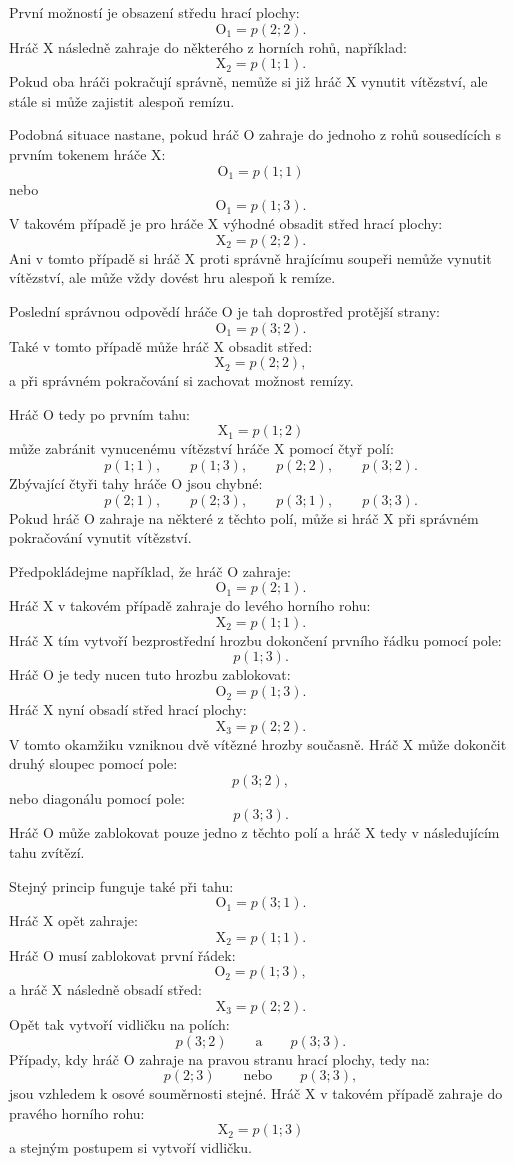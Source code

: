 \documentclass[12pt,a4paper]{article}
\begin{document}
První možností je obsazení středu hrací plochy:
\[
    \mathrm{O}_1=p(2;2).
\]
Hráč $\mathrm{X}$ následně zahraje do některého z horních rohů, například:
\[
    \mathrm{X}_2=p(1;1).
\]
Pokud oba hráči pokračují správně, nemůže si již hráč $\mathrm{X}$ vynutit vítězství, 
ale stále si může zajistit alespoň remízu.

Podobná situace nastane, pokud hráč $\mathrm{O}$ zahraje do 
jednoho z rohů sousedících s prvním tokenem hráče $\mathrm{X}$:
\[
    \mathrm{O}_1=p(1;1)
\]
nebo
\[
    \mathrm{O}_1=p(1;3).
\]
V takovém případě je pro hráče $\mathrm{X}$ výhodné obsadit střed hrací plochy:
\[
    \mathrm{X}_2=p(2;2).
\]
Ani v tomto případě si hráč $\mathrm{X}$ proti správně hrajícímu 
soupeři nemůže vynutit vítězství, ale může vždy dovést hru alespoň k remíze.

Poslední správnou odpovědí hráče $\mathrm{O}$ je tah doprostřed protější strany:
\[
    \mathrm{O}_1=p(3;2).
\]
Také v tomto případě může hráč $\mathrm{X}$ obsadit střed:
\[
    \mathrm{X}_2=p(2;2),
\]
a při správném pokračování si zachovat možnost remízy.

Hráč $\mathrm{O}$ tedy po prvním tahu:
\[
    \mathrm{X}_1=p(1;2)
\]
může zabránit vynucenému vítězství hráče $\mathrm{X}$ pomocí čtyř polí:
\[
    p(1;1),\qquad
    p(1;3),\qquad
    p(2;2),\qquad
    p(3;2).
\]
Zbývající čtyři tahy hráče $\mathrm{O}$ jsou chybné:
\[
    p(2;1),\qquad
    p(2;3),\qquad
    p(3;1),\qquad
    p(3;3).
\]
Pokud hráč $\mathrm{O}$ zahraje na některé z těchto polí, 
může si hráč $\mathrm{X}$ při správném pokračování vynutit vítězství.

Předpokládejme například, že hráč $\mathrm{O}$ zahraje:
\[
    \mathrm{O}_1=p(2;1).
\]
Hráč $\mathrm{X}$ v takovém případě zahraje do levého horního rohu:
\[
    \mathrm{X}_2=p(1;1).
\]
Hráč $\mathrm{X}$ tím vytvoří bezprostřední hrozbu dokončení prvního řádku pomocí pole:
\[
    p(1;3).
\]
Hráč $\mathrm{O}$ je tedy nucen tuto hrozbu zablokovat:
\[
    \mathrm{O}_2=p(1;3).
\]
Hráč $\mathrm{X}$ nyní obsadí střed hrací plochy:
\[
    \mathrm{X}_3=p(2;2).
\]
V tomto okamžiku vzniknou dvě vítězné hrozby současně. 
Hráč $\mathrm{X}$ může dokončit druhý sloupec pomocí pole:
\[
    p(3;2),
\]
nebo diagonálu pomocí pole:
\[
    p(3;3).
\]
Hráč $\mathrm{O}$ může zablokovat pouze jedno z těchto polí 
a hráč $\mathrm{X}$ tedy v následujícím tahu zvítězí.

Stejný princip funguje také při tahu:
\[
    \mathrm{O}_1=p(3;1).
\]
Hráč $\mathrm{X}$ opět zahraje:
\[
    \mathrm{X}_2=p(1;1).
\]
Hráč $\mathrm{O}$ musí zablokovat první řádek:
\[
    \mathrm{O}_2=p(1;3),
\]
a hráč $\mathrm{X}$ následně obsadí střed:
\[
    \mathrm{X}_3=p(2;2).
\]
Opět tak vytvoří vidličku na polích:
\[
    p(3;2)
    \qquad\text{a}\qquad
    p(3;3).
\]
Případy, kdy hráč $\mathrm{O}$ zahraje na pravou stranu hrací plochy, tedy na:
\[
    p(2;3)
    \qquad\text{nebo}\qquad
    p(3;3),
\]
jsou vzhledem k osové souměrnosti stejné. 
Hráč $\mathrm{X}$ v takovém případě zahraje do pravého horního rohu:
\[
    \mathrm{X}_2=p(1;3)
\]
a stejným postupem si vytvoří vidličku.
\end{document}
